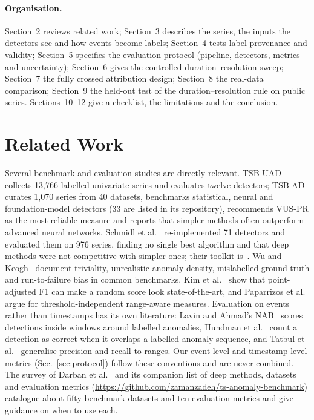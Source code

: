\documentclass[10pt,twocolumn]{article}
\begin{document}
\paragraph{Organisation.} Section~2 reviews related work; Section~3 describes the series, the inputs the detectors see and how events become labels; Section~4 tests label provenance and validity; Section~5 specifies the evaluation protocol (pipeline, detectors, metrics and uncertainty); Section~6 gives the controlled duration--resolution sweep; Section~7 the fully crossed attribution design; Section~8 the real-data comparison; Section~9 the held-out test of the duration--resolution rule on public series. Sections~10--12 give a checklist, the limitations and the conclusion.


\section{Related Work}
Several benchmark and evaluation studies are directly relevant. TSB-UAD~\cite{paparrizos2022tsb} collects 13{,}766 labelled univariate series and evaluates twelve detectors; TSB-AD~\cite{liu2024elephant} curates 1{,}070 series from 40 datasets, benchmarks statistical, neural and foundation-model detectors (33 are listed in its repository), recommends VUS-PR as the most reliable measure and reports that simpler methods often outperform advanced neural networks. Schmidl et al.~\cite{schmidl2022comprehensive} re-implemented 71 detectors and evaluated them on 976 series, finding no single best algorithm and that deep methods were not competitive with simpler ones; their toolkit is~\cite{wenig2022timeeval}. Wu and Keogh~\cite{wu2023flawed} document triviality, unrealistic anomaly density, mislabelled ground truth and run-to-failure bias in common benchmarks. Kim et al.~\cite{kim2022rigorous} show that point-adjusted F1 can make a random score look state-of-the-art, and Paparrizos et al.~\cite{paparrizos2022vus} argue for threshold-independent range-aware measures. Evaluation on events rather than timestamps has its own literature: Lavin and Ahmad's NAB~\cite{lavin2015nab} scores detections inside windows around labelled anomalies, Hundman et al.~\cite{hundman2018telemanom} count a detection as correct when it overlaps a labelled anomaly sequence, and Tatbul et al.~\cite{tatbul2018precision} generalise precision and recall to ranges. Our event-level and timestamp-level metrics (Sec.~\ref{sec:protocol}) follow these conventions and are never combined. The survey of Darban et al.~\cite{darban2024survey} and its companion list of deep methods, datasets and evaluation metrics (\url{https://github.com/zamanzadeh/ts-anomaly-benchmark}) catalogue about fifty benchmark datasets and ten evaluation metrics and give guidance on when to use each.
\end{document}
